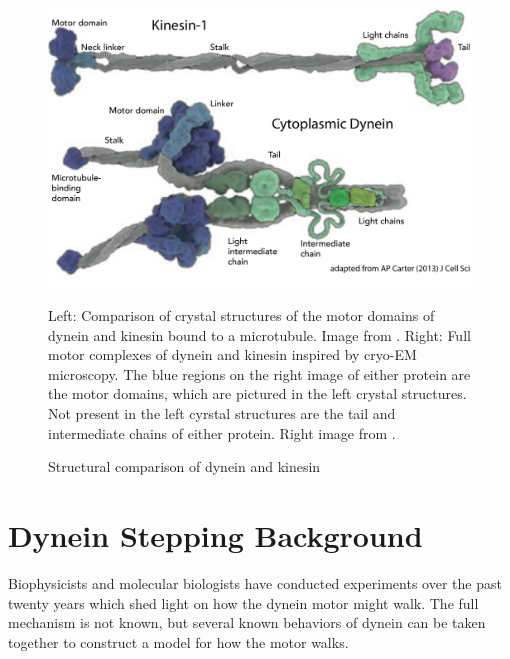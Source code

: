 \documentclass[
11pt, %
english, %
singlespacing, %
headsepline, %
chapterinoneline, %
]{MastersDoctoralThesis} %
\begin{document}
\begin{figure}[H]
\begin{minipage}{0.65\textwidth}
    \includegraphics[width=\textwidth,keepaspectratio]{../figures/kinesin_vs_dynein_2}
  \end{minipage}
  \caption{Structural comparison of dynein and kinesin}{Left: Comparison of crystal structures of the motor domains of dynein and kinesin bound to a microtubule. Image from \cite{kinesin-vs-dynein}. Right: Full motor complexes of dynein and kinesin inspired by cryo-EM microscopy. The blue regions on the right image of either protein are the motor domains, which are pictured in the left crystal structures. Not present in the left cyrstal structures are the tail and intermediate chains of either protein. Right image from \cite{kinesin-vs-dynein-2}.}
  \label{fig:kinesin-vs-dynein}
\end{figure}

\section{Dynein Stepping Background}
Biophysicists and molecular biologists have conducted experiments over the past twenty years which shed light on how the dynein motor might walk. The full mechanism is not known, but several known behaviors of dynein can be taken together to construct a model for how the motor walks.\\
\end{document}
